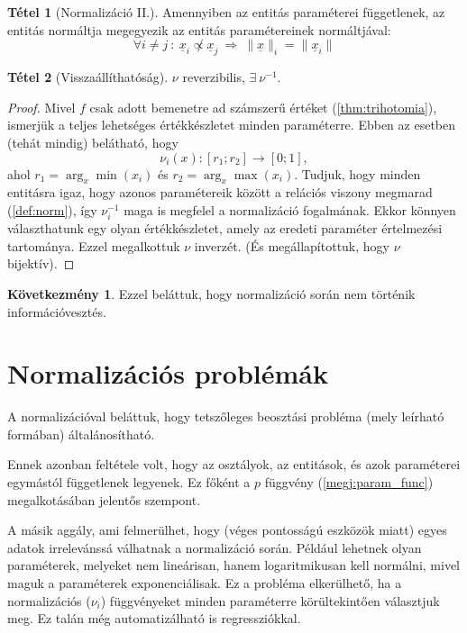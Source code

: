 \documentclass[twocolumn]{article}
\theoremstyle{definition}
\newtheorem{theorem}{Tétel}[section]
\newtheorem*{kov}{Következmény}
\newcommand{\vect}[1]{ \underline{#1} }
\newcommand{\norm}[1]{ \parallel {#1} \parallel }
\begin{document}
    \begin{theorem}[Normalizáció II.]
        Amennyiben az entitás paraméterei függetlenek, az entitás normáltja megegyezik az entitás paramétereinek normáltjával:
        \begin{equation}
            \forall i \neq j \ : \ 
            \vect x_i \not \propto \vect x_j 
            \ \Longrightarrow \
            \norm{\vect x}_i = \norm{\vect x_i}
        \end{equation}
    \end{theorem}
    
    \begin{theorem}[Visszaállíthatóság]
        $\nu$ reverzibilis, $\exists \ \nu^{-1}$.
        
        \begin{proof}
            Mivel $f$ csak adott bemenetre ad számszerű értéket (\ref{thm:trihotomia}), ismerjük a teljes lehetséges értékkészletet minden paraméterre. Ebben az esetben (tehát mindig) belátható, hogy 
            $$ \nu_i(x) : [r_1; r_2] \to [0; 1], $$
            ahol $r_1 = \arg_x\min(x_i)$ és $r_2 = \arg_x\max(x_i)$.
            Tudjuk, hogy minden entitásra igaz, hogy azonos paramétereik között a relációs viszony megmarad (\ref{def:norm}), így $\nu_i^{-1}$ maga is megfelel a normalizáció fogalmának. Ekkor könnyen választhatunk egy olyan értékkészletet, amely az eredeti paraméter értelmezési tartománya. Ezzel megalkottuk $\nu$ inverzét. (És megállapítottuk, hogy $\nu$ bijektív).
        \end{proof}
        \begin{kov}
            Ezzel beláttuk, hogy normalizáció során nem történik információvesztés.
        \end{kov}
    \end{theorem}
    
\section{Normalizációs problémák}
    A normalizációval beláttuk, hogy tetszőleges beosztási probléma (mely leírható \az{(\ref{def:problema})} formában) általánosítható. 
    
    Ennek azonban feltétele volt, hogy az osztályok, az entitások, és azok paraméterei egymástól függetlenek legyenek. Ez főként a $p$ függvény (\ref{megj:param_func}) megalkotásában jelentős szempont.
    
    A másik aggály, ami felmerülhet, hogy (véges pontosságú eszközök miatt) egyes adatok irrelevánssá válhatnak a normalizáció során. Például lehetnek olyan paraméterek, melyeket nem lineárisan, hanem logaritmikusan kell normálni, mivel maguk a paraméterek exponenciálisak. Ez a probléma elkerülhető, ha a normalizációs ($\nu_i$) függvényeket minden paraméterre körültekintően választjuk meg. Ez talán még automatizálható is regressziókkal.
    
\end{document}
